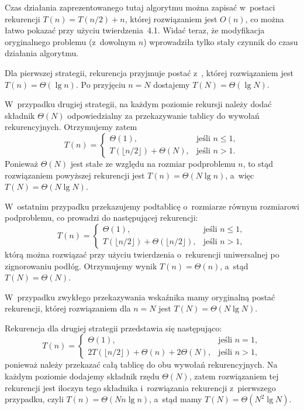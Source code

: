 Czas działania zaprezentowanego tutaj algorytmu można zapisać w~postaci rekurencji $T(n)=T(n/2)+n$, której rozwiązaniem jest $O(n)$, co można łatwo pokazać przy użyciu twierdzenia~4.1. Widać teraz, że modyfikacja oryginalnego problemu (z~dowolnym $n$) wprowadziła tylko stały czynnik do czasu działania algorytmu.


\subproblem %
Dla pierwszej strategii, rekurencja przyjmuje postać z~, której rozwiązaniem jest $T(n)=\Theta(\lg n)$. Po przyjęciu $n=N$ dostajemy $T(N)=\Theta(\lg N)$.

W~przypadku drugiej strategii, na każdym poziomie rekursji należy dodać składnik $\Theta(N)$ odpowiedzialny za przekazywanie tablicy do wywołań rekurencyjnych. Otrzymujemy zatem
\[
	T(n) = \begin{cases}
		\Theta(1), & \text{jeśli $n\le1$}, \\
		T(\lfloor n/2\rfloor)+\Theta(N), & \text{jeśli $n>1$}.
	\end{cases}
\]
Ponieważ $\Theta(N)$ jest stałe ze względu na rozmiar podproblemu $n$, to stąd rozwiązaniem powyższej rekurencji jest $T(n)=\Theta(N\lg n)$, a~więc $T(N)=\Theta(N\lg N)$.

W~ostatnim przypadku przekazujemy podtablicę o~rozmiarze równym rozmiarowi podproblemu, co prowadzi do następującej rekurencji:
\[
	T(n) = \begin{cases}
		\Theta(1), & \text{jeśli $n\le1$}, \\
		T(\lfloor n/2\rfloor)+\Theta(\lfloor n/2\rfloor), & \text{jeśli $n>1$},
	\end{cases}
\]
którą można rozwiązać przy użyciu twierdzenia o~rekurencji uniwersalnej po zignorowaniu podłóg. Otrzymujemy wynik $T(n)=\Theta(n)$, a~stąd $T(N)=\Theta(N)$.

\subproblem %
W~przypadku zwykłego przekazywania wskaźnika mamy oryginalną postać rekurencji, której rozwiązaniem dla $n=N$ jest $T(N)=\Theta(N\lg N)$.

Rekurencja dla drugiej strategii przedstawia się następująco:
\[
	T(n) = \begin{cases}
		\Theta(1), & \text{jeśli $n=1$}, \\
		2T(\lfloor n/2\rfloor)+\Theta(n)+2\Theta(N), & \text{jeśli $n>1$},
	\end{cases}
\]
ponieważ należy przekazać całą tablicę do obu wywołań rekurencyjnych. Na każdym poziomie dodajemy składnik rzędu $\Theta(N)$, zatem rozwiązaniem tej rekurencji jest iloczyn tego składnika i~rozwiązania rekurencji z~pierwszego przypadku, czyli $T(n)=\Theta(Nn\lg n)$, a~stąd mamy $T(N)=\Theta(N^2\lg N)$.

